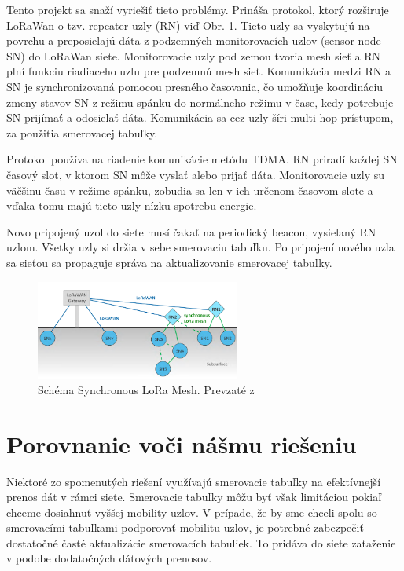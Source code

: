 \documentclass[slovak,master]{diploma}
\begin{document}
Tento projekt sa snaží vyriešiť tieto problémy. Prináša protokol, ktorý rozširuje LoRaWan o tzv. repeater uzly (RN) viď Obr. \ref{fig:synchronouslora}. Tieto uzly sa vyskytujú na povrchu a preposielajú dáta z 
podzemných monitorovacích uzlov (sensor node  - SN) do LoRaWan siete. Monitorovacie uzly pod zemou tvoria mesh sieť a RN plní funkciu riadiaceho uzlu pre podzemnú mesh sieť. 
Komunikácia medzi RN a SN je synchronizovaná pomocou presného časovania, čo umožňuje koordináciu zmeny stavov SN z režimu spánku do normálneho režimu v čase, kedy 
potrebuje SN prijímať a odosielať dáta. Komunikácia sa cez uzly šíri multi-hop prístupom, za použitia smerovacej tabuľky.

Protokol používa na riadenie komunikácie metódu TDMA. RN priradí každej SN časový slot, v ktorom SN môže vyslať alebo prijať dáta.
Monitorovacie uzly su väčšinu času v režime spánku, zobudia sa len v ich určenom časovom slote a vďaka tomu majú tieto uzly nízku spotrebu energie.

Novo pripojený uzol do siete musí čakať na periodický beacon, vysielaný RN uzlom. Všetky uzly si držia v sebe smerovaciu tabuľku. Po pripojení nového uzla sa sieťou sa propaguje 
správa na aktualizovanie smerovacej tabuľky.

\begin{figure}
	\centering
	\includegraphics[width=0.6\textwidth]{Figures/synchronouslorameshnetwork.png}
	\caption{Schéma Synchronous LoRa Mesh. Prevzaté z \cite{synchronouslorameshnetwork}}
	\label{fig:synchronouslora}
\end{figure}


\section{Porovnanie voči nášmu riešeniu}
Niektoré zo spomenutých riešení využívajú smerovacie tabuľky na efektívnejší prenos dát v rámci siete. Smerovacie tabuľky môžu byť však limitáciou pokiaľ 
chceme dosiahnuť vyššej mobility uzlov. V prípade, že by sme chceli spolu so smerovacími tabuľkami podporovať mobilitu uzlov, je potrebné zabezpečiť dostatočné časté aktualizácie smerovacích tabuliek.
To pridáva do siete zaťaženie v podobe dodatočných dátových prenosov.
\end{document}
